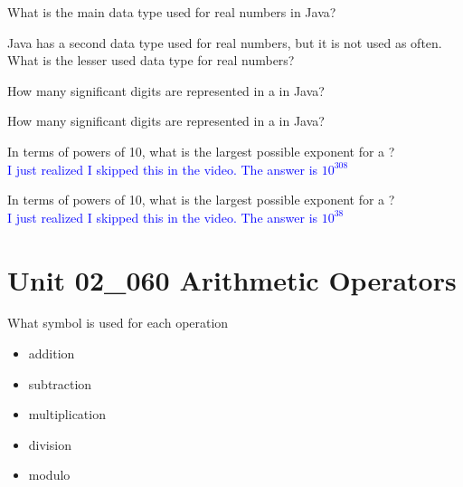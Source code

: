 \documentclass[letterpaper,12pt]{exam}
\newcommand{\unit}{Unit 02}
\begin{document}
\begin{questions}
\begin{samepage}
	\question What is the main data type used for real numbers in Java?
	\vspace{5mm}
\end{samepage}
\begin{samepage}
	\question Java has a second data type used for real numbers, but it is not used as often.  What is the lesser used data type for real numbers?
	\vspace{5mm}
\end{samepage}
\begin{samepage}
	\question How many significant digits are represented in a  in Java?
	\vspace{5mm}
\end{samepage}
\begin{samepage}
	\question How many significant digits are represented in a  in Java?
	\vspace{5mm}
\end{samepage}
\begin{samepage}
	\question In terms of powers of 10, what is the largest possible exponent for a ?\\
	\textcolor{blue}{I just realized I skipped this in the video.  The answer is $10^{308}$}
	\vspace{5mm}
\end{samepage}
\begin{samepage}
	\question In terms of powers of 10, what is the largest possible exponent for a ?\\
	\textcolor{blue}{I just realized I skipped this in the video.  The answer is $10^{38}$}
	\vspace{5mm}
\end{samepage}

\section*{\unit\_060 Arithmetic Operators} %

\begin{samepage}
	\question What symbol is used for each operation
	  \begin{itemize}
		\item addition
		\vspace{5mm}
		\item subtraction
		\vspace{5mm}
		\item multiplication
		\vspace{5mm}
		\item division
		\vspace{5mm}
		\item modulo
		\vspace{4mm}
	   \end{itemize}
\end{samepage}


\end{questions}
\end{document}
